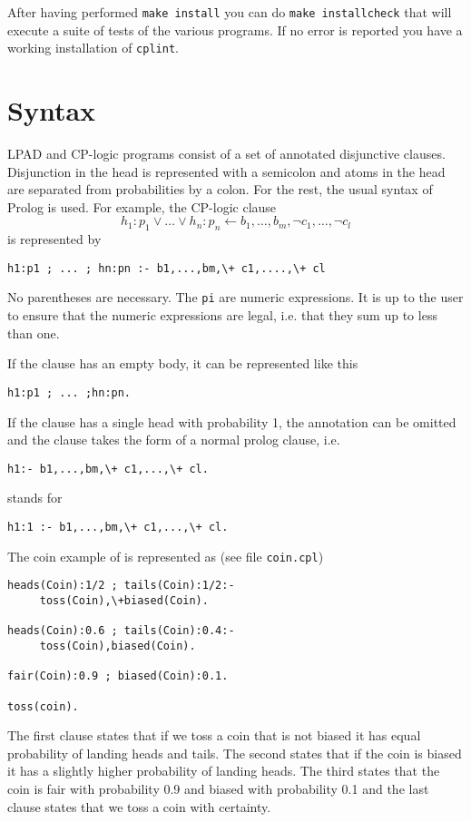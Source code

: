 \documentclass[a4paper,10pt]{scrartcl}
\begin{document}
After having performed \texttt{make install} you can do \texttt{make installcheck} that will execute a suite of tests of the various programs. If no error is reported you have a working installation of \texttt{cplint}.


\section{Syntax}

LPAD and CP-logic programs consist of a set of annotated disjunctive clauses.
Disjunction in the head is represented with a semicolon and atoms in the head are separated from probabilities by a colon. For the rest, the usual syntax of Prolog is used.
For example, the  CP-logic clause
$$h_1:p_1\vee \ldots \vee h_n:p_n\leftarrow b_1,\dots,b_m ,\neg c_1,\ldots,\neg c_l$$
is represented by
\begin{verbatim}
h1:p1 ; ... ; hn:pn :- b1,...,bm,\+ c1,....,\+ cl
\end{verbatim}
 No parentheses are necessary. The \texttt{pi} are numeric expressions. It is up to the user to ensure that the numeric expressions are legal, i.e. that they sum up to less than one.

If the clause has an empty body, it can be represented like this
\begin{verbatim}
h1:p1 ; ... ;hn:pn.
\end{verbatim}
If the clause has a single head with probability 1, the annotation can be omitted and the clause takes the form of a normal prolog clause, i.e. 
\begin{verbatim}
h1:- b1,...,bm,\+ c1,...,\+ cl.
\end{verbatim}
stands for 
\begin{verbatim}
h1:1 :- b1,...,bm,\+ c1,...,\+ cl.
\end{verbatim}

The coin example of  \cite{VenVer04-ICLP04-IC} is represented as (see file \texttt{coin.cpl})
\begin{verbatim}
heads(Coin):1/2 ; tails(Coin):1/2:- 
     toss(Coin),\+biased(Coin).

heads(Coin):0.6 ; tails(Coin):0.4:- 
     toss(Coin),biased(Coin).

fair(Coin):0.9 ; biased(Coin):0.1.

toss(coin).
\end{verbatim}
The first clause states that if we toss a coin that is not biased it has equal probability of landing heads and tails. The second states that if the coin is biased it has a slightly higher probability of landing heads. The third states that the coin is fair with probability 0.9 and biased with probability 0.1 and the last clause states that we toss a coin with certainty.
\end{document}
